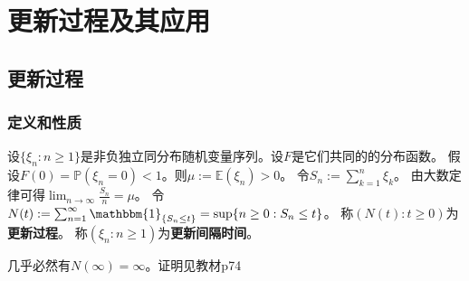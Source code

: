 \documentclass[main]{subfiles}
\begin{document}
\section{更新过程及其应用}%
\subsection{更新过程}
\subsubsection{定义和性质}
\begin{definition}\label{def:renew_progress}
  设\(\{\xi_n:n \geq 1\}\)是非负独立同分布随机变量序列。设\(F\)是它们共同的的分布函数。
  假设\(F(0)=\mathbb{P}(\xi_n=0)<1\)。则\(\mu:=\mathbb{E}(\xi_n)>0\)。
  令\(S_n:=\sum_{k=1}^{n} \xi_k\)。
  由大数定律可得\(\lim_{n \to \infty}\frac{S_n}{n}=\mu\)。
  令\(N(t):=\sum_{n=1}^{\infty} \mathbbm{1}_{\{S_n \leq t\}}=\sup \{n \geq 0:S_n \leq t\}\)。
  称\((N(t):t \geq 0)\)为\textbf{更新过程}。
  称\((\xi_n:n \geq 1)\)为\textbf{更新间隔时间}。
\end{definition}
\begin{theorem}\label{the:nifnequifn}
  几乎必然有\(N(\infty)=\infty\)。证明见教材p74
\end{theorem}
\end{document}

